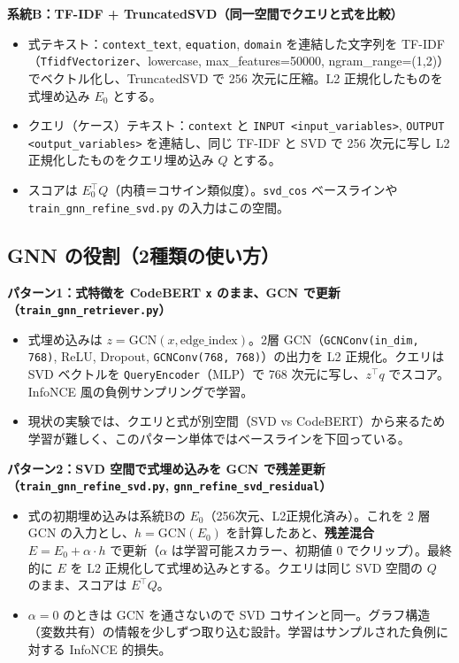 \documentclass[11pt,a4paper]{jsarticle}
\begin{document}
\textbf{系統B：TF-IDF + TruncatedSVD（同一空間でクエリと式を比較）}
\begin{itemize}[nosep]
  \item 式テキスト：\texttt{context\_text}, \texttt{equation}, \texttt{domain} を連結した文字列を TF-IDF（\texttt{TfidfVectorizer}、lowercase, max\_features=50000, ngram\_range=(1,2)）でベクトル化し、TruncatedSVD で 256 次元に圧縮。L2 正規化したものを式埋め込み $E_0$ とする。
  \item クエリ（ケース）テキスト：\texttt{context} と \texttt{INPUT <input\_variables>}, \texttt{OUTPUT <output\_variables>} を連結し、同じ TF-IDF と SVD で 256 次元に写し L2 正規化したものをクエリ埋め込み $Q$ とする。
  \item スコアは $E_0^\top Q$（内積＝コサイン類似度）。\texttt{svd\_cos} ベースラインや \texttt{train\_gnn\_refine\_svd.py} の入力はこの空間。
\end{itemize}

\subsection{GNN の役割（2種類の使い方）}
\textbf{パターン1：式特徴を CodeBERT \texttt{x} のまま、GCN で更新（\texttt{train\_gnn\_retriever.py}）}
\begin{itemize}[nosep]
  \item 式埋め込みは $z = \mathrm{GCN}(x, \mathrm{edge\_index})$。2層 GCN（\texttt{GCNConv(in\_dim, 768)}, ReLU, Dropout, \texttt{GCNConv(768, 768)}）の出力を L2 正規化。クエリは SVD ベクトルを \texttt{QueryEncoder}（MLP）で 768 次元に写し、$z^\top q$ でスコア。InfoNCE 風の負例サンプリングで学習。
  \item 現状の実験では、クエリと式が別空間（SVD vs CodeBERT）から来るため学習が難しく、このパターン単体ではベースラインを下回っている。
\end{itemize}

\textbf{パターン2：SVD 空間で式埋め込みを GCN で残差更新（\texttt{train\_gnn\_refine\_svd.py}, \texttt{gnn\_refine\_svd\_residual}）}
\begin{itemize}[nosep]
  \item 式の初期埋め込みは系統Bの $E_0$（256次元、L2正規化済み）。これを 2 層 GCN の入力とし、$h = \mathrm{GCN}(E_0)$ を計算したあと、\textbf{残差混合} $E = E_0 + \alpha \cdot h$ で更新（$\alpha$ は学習可能スカラー、初期値 0 でクリップ）。最終的に $E$ を L2 正規化して式埋め込みとする。クエリは同じ SVD 空間の $Q$ のまま、スコアは $E^\top Q$。
  \item $\alpha=0$ のときは GCN を通さないので SVD コサインと同一。グラフ構造（変数共有）の情報を少しずつ取り込む設計。学習はサンプルされた負例に対する InfoNCE 的損失。
\end{itemize}
\end{document}
